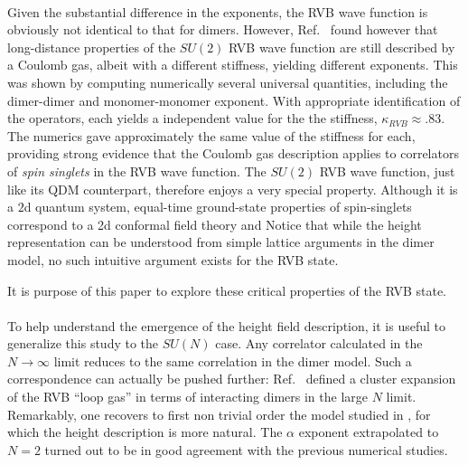 \documentclass[11pt]{iopart}
\begin{document}
\paragraph{} Given the substantial difference in the exponents, the RVB wave function is obviously not identical to that for dimers. However, Ref.~\cite{RVB2} found however that long-distance properties of the $SU(2)$ RVB wave function are still described by a Coulomb gas, albeit with a different stiffness, yielding different exponents. This was shown by computing numerically several universal quantities, including the dimer-dimer and monomer-monomer exponent. With appropriate identification of the operators, each yields a independent value for the the stiffness, $\kappa_{RVB}\approx .83$. The numerics gave approximately the same value of the stiffness for each, providing strong evidence that the Coulomb gas description applies to correlators of {\em spin singlets} in the RVB wave function. The $SU(2)$ RVB wave function, just like its QDM counterpart, therefore enjoys a very special property. Although it is a $2$d quantum system, equal-time ground-state properties of spin-singlets correspond to a 2d 
conformal field theory\cite{QuantumLifshitz} and 
Notice that while the height representation can be understood from simple lattice arguments in the dimer model, no such intuitive argument exists for the RVB state. 

It is purpose of this paper to explore these critical properties of the RVB state.


\paragraph{}To help understand the emergence of the height field description, it is useful to generalize this study to the $SU(N)$ case. Any correlator calculated in the $N\to \infty$ limit reduces to the same correlation in the dimer model. Such a correspondence can actually be pushed further: Ref.~\cite{Damle} defined a cluster expansion of the RVB ``loop gas''\cite{Sutherland_loops} in terms of interacting dimers in the large $N$ limit. Remarkably, one recovers to first non trivial order the model studied in \cite{Alet_dimers1,Alet_dimers2}, for which the height description is more natural. The $\alpha$ exponent extrapolated to $N=2$ turned out to be in good agreement with the previous numerical studies\cite{RVB1,RVB2}.
\end{document}
